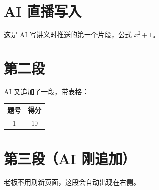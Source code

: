\documentclass{article}
\begin{document}
\section{AI 直播写入}
这是 AI 写讲义时推送的第一个片段，公式 $x^2+1$。

\section{第二段}
AI 又追加了一段，带表格：
\begin{tabular}{|c|c|}\hline 题号 & 得分 \\ \hline 1 & 10 \\ \hline\end{tabular}

\section{第三段（AI 刚追加）}
老板不用刷新页面，这段会自动出现在右侧。
\end{document}
